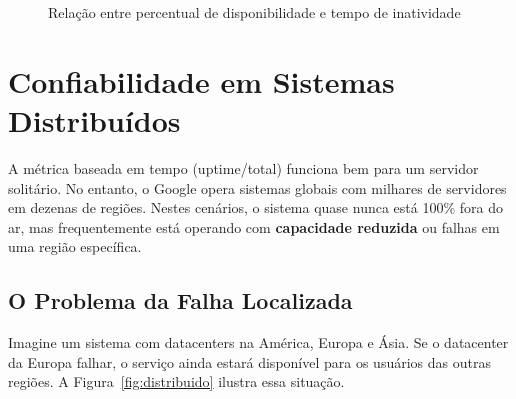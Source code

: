 \documentclass[12pt,a4paper]{report}
\begin{document}
\begin{figure}[h]
    \centering
    \caption{Relação entre percentual de disponibilidade e tempo de inatividade}
    \label{fig:log-noves}
\end{figure}

\section{Confiabilidade em Sistemas Distribuídos}

A métrica baseada em tempo (uptime/total) funciona bem para um servidor solitário. No entanto, o Google opera sistemas globais com milhares de servidores em dezenas de regiões. Nestes cenários, o sistema quase nunca está 100\% fora do ar, mas frequentemente está operando com \textbf{capacidade reduzida} ou falhas em uma região específica.

\subsection{O Problema da Falha Localizada}

Imagine um sistema com datacenters na América, Europa e Ásia. Se o datacenter da Europa falhar, o serviço ainda estará disponível para os usuários das outras regiões. A Figura~\ref{fig:distribuido} ilustra essa situação.
\end{document}

